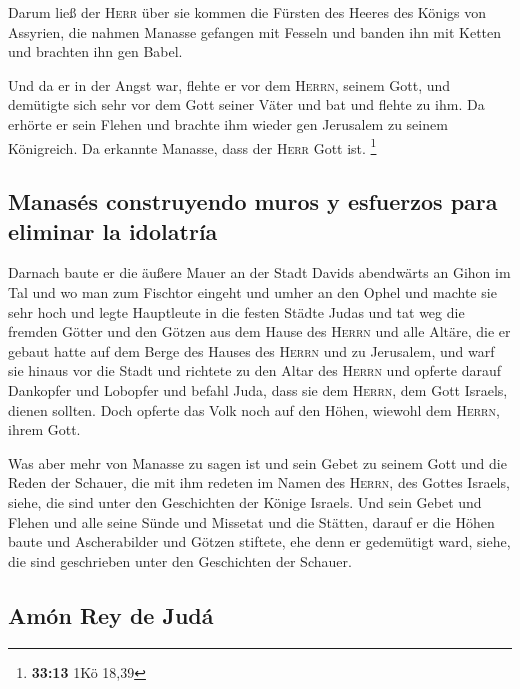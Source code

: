  Darum ließ der \textsc{Herr} über sie kommen die Fürsten
des Heeres des Königs von Assyrien, die nahmen Manasse gefangen mit
Fesseln und banden ihn mit Ketten und brachten ihn gen Babel.

 Und da er in der Angst war, flehte er vor dem
\textsc{Herrn}, seinem Gott, und demütigte sich sehr vor dem Gott seiner
Väter  und bat und flehte zu ihm. Da erhörte er sein
Flehen und brachte ihm wieder gen Jerusalem zu seinem Königreich. Da
erkannte Manasse, dass der \textsc{Herr} Gott ist. \footnote{\textbf{33:13}
  1Kö 18,39}

\hypertarget{manasuxe9s-construyendo-muros-y-esfuerzos-para-eliminar-la-idolatruxeda}{%
\subsection{Manasés construyendo muros y esfuerzos para eliminar la
idolatría}\label{manasuxe9s-construyendo-muros-y-esfuerzos-para-eliminar-la-idolatruxeda}}

 Darnach baute er die äußere Mauer an der Stadt Davids
abendwärts an Gihon im Tal und wo man zum Fischtor eingeht und umher an
den Ophel und machte sie sehr hoch und legte Hauptleute in die festen
Städte Judas  und tat weg die fremden Götter und den
Götzen aus dem Hause des \textsc{Herrn} und alle Altäre, die er gebaut
hatte auf dem Berge des Hauses des \textsc{Herrn} und zu Jerusalem, und
warf sie hinaus vor die Stadt  und richtete zu den Altar
des \textsc{Herrn} und opferte darauf Dankopfer und Lobopfer und befahl
Juda, dass sie dem \textsc{Herrn}, dem Gott Israels, dienen sollten.
 Doch opferte das Volk noch auf den Höhen, wiewohl dem
\textsc{Herrn}, ihrem Gott.

 Was aber mehr von Manasse zu sagen ist und sein Gebet zu
seinem Gott und die Reden der Schauer, die mit ihm redeten im Namen des
\textsc{Herrn}, des Gottes Israels, siehe, die sind unter den
Geschichten der Könige Israels.  Und sein Gebet und
Flehen und alle seine Sünde und Missetat und die Stätten, darauf er die
Höhen baute und Ascherabilder und Götzen stiftete, ehe denn er
gedemütigt ward, siehe, die sind geschrieben unter den Geschichten der
Schauer.

\hypertarget{amuxf3n-rey-de-juduxe1}{%
\subsection{Amón Rey de Judá}\label{amuxf3n-rey-de-juduxe1}}

